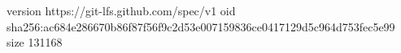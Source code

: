version https://git-lfs.github.com/spec/v1
oid sha256:ac684e286670b86f87f56f9c2d53e007159836ce0417129d5c964d753fec5e99
size 131168
